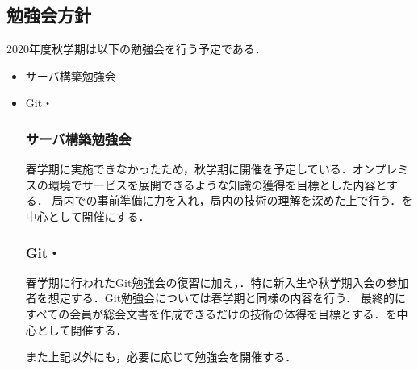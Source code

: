 \subsection*{勉強会方針}


2020年度秋学期は以下の勉強会を行う予定である．
\begin{itemize}
	\item サーバ構築勉強会
	\item Git・
\subsubsection*{サーバ構築勉強会}
春学期に実施できなかったため，秋学期に開催を予定している．オンプレミスの環境でサービスを展開できるような知識の獲得を目標とした内容とする．
局内での事前準備に力を入れ，局内の技術の理解を深めた上で行う．\secondGrade{}を中心として開催にする．
\subsubsection*{Git・}
春学期に行われたGit勉強会の復習に加え，．特に新入生や秋学期入会の参加者を想定する．Git勉強会については春学期と同様の内容を行う．
最終的にすべての会員が総会文書を作成できるだけの技術の体得を目標とする．\secondGrade{}を中心として開催する．

また上記以外にも，必要に応じて勉強会を開催する．
\end{itemize}
